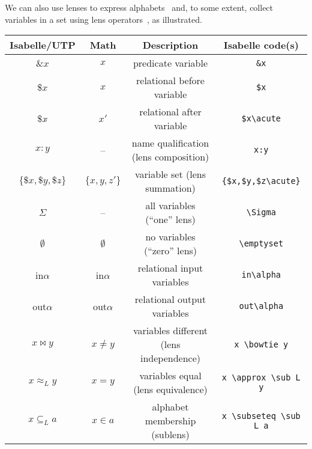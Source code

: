 \documentclass[11pt]{article}
\begin{document}
We can also use lenses to express alphabets~\cite{Foster17a} and, to some extent, collect variables in a set using lens
operators~\cite{Foster16a}, as illustrated.

\vspace{4ex}

\begin{center}
\begin{tabular}{|c|c|c|c|} \hline
  \textbf{Isabelle/UTP}    & \textbf{Math}      & \textbf{Description}                  & \textbf{Isabelle code(s)} \\ \hline
  $\&x$                    & $x$                & predicate variable                    & \verb|&x| \\
  $\mathdollar x$          & $x$                & relational before variable            & \verb|$x| \\
  $\mathdollar x \acute{}$ & $x'$               & relational after variable             & \verb|$x\acute| \\
  $x\!:\!y$                & --                 & name qualification (lens composition) & \verb|x:y| \\
  $\{\mathdollar x,\mathdollar y, \mathdollar z \acute{}\}$  
                           & $\{x,y,z'\}$       & variable set (lens summation)         & \verb|{$x,$y,$z\acute}| \\
  $\Sigma$                 & --                 & all variables (``one'' lens)          & \verb|\Sigma| \\
  $\emptyset$              & $\emptyset$        & no variables (``zero'' lens)          & \verb|\emptyset| \\
  in$\alpha$               & in$\alpha$         & relational input variables            & \verb|in\alpha| \\
  out$\alpha$              & out$\alpha$        & relational output variables           & \verb|out\alpha| \\
  $x \mathop{\bowtie} y$   & $x \neq y$         & variables different (lens independence) & \verb|x \bowtie y| \\
  $x \approx_L y$          & $x = y$            & variables equal (lens equivalence)     & \verb|x \approx \sub L y| \\
  $x \subseteq_L a$        & $x \in a$          & alphabet membership (sublens)         & \verb|x \subseteq \sub L a| \\
  \hline
\end{tabular}
\end{center}
\end{document}
